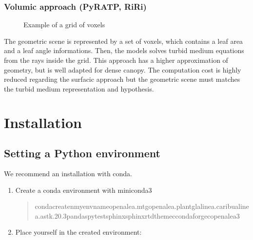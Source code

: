 \documentclass[letterpaper,10pt,english]{sphinxmanual}
\let\sphinxpxdimen\pdfpxdimen\else\newdimen\sphinxpxdimen
\begin{document}
\subsubsection{Volumic approach (PyRATP, RiRi)}
\label{\detokenize{presentation:volumic-approach-pyratp-riri}}
\begin{figure}[htbp]
\centering
\capstart

\noindent\sphinxincludegraphics[width=701\sphinxpxdimen,height=752\sphinxpxdimen]{{voxels}.PNG}
\caption{Example of a grid of voxels}\label{\detokenize{presentation:id4}}\end{figure}

\sphinxAtStartPar
The geometric scene is represented by a set of voxels, which contains a leaf area and a leaf angle informations.
Then, the models solves turbid medium equations from the rays inside the grid.
This approach has a higher approximation of geometry, but is well adapted for dense canopy.
The computation cost is highly reduced regarding the surfacic approach but the geometric scene must matches the turbid medium representation and hypothesis.

\sphinxstepscope


\section{Installation}
\label{\detokenize{installation:installation}}\label{\detokenize{installation:id1}}\label{\detokenize{installation::doc}}

\subsection{Setting a Python environment}
\label{\detokenize{installation:setting-a-python-environment}}
\sphinxAtStartPar
We recommend an installation with conda.
\begin{enumerate}
%
\item {} 
\sphinxAtStartPar
Create a conda environment with miniconda3
\begin{quote}

\begin{sphinxVerbatim}[commandchars=\\\{\}]
condacreate\PYGZhy{}nmyenvnameopenalea.mtgopenalea.plantglalinea.caribualinea.astk.20.3pandaspytestsphinxsphinx\PYGZhy{}rtd\PYGZhy{}theme\PYGZhy{}cconda\PYGZhy{}forge\PYGZhy{}copenalea3
\end{sphinxVerbatim}
\end{quote}

\item {} 
\sphinxAtStartPar
Place yourself in the created environment: 

\end{enumerate}
\end{document}
